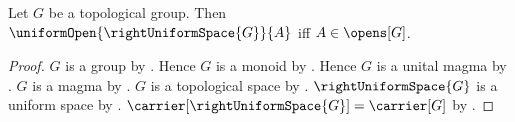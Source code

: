 \begin{theorem}\label{right_uniform_open_iff_topological_group_open}
    Let $G$ be a topological group.
    Then $\uniformOpen{\rightUniformSpace{G}}{A}$ iff $A\in\opens[G]$.
\end{theorem}
\begin{proof}
    $G$ is a group by .
    Hence $G$ is a monoid by .
    Hence $G$ is a unital magma by .
    $G$ is a magma by .
    $G$ is a topological space
        by .
    $\rightUniformSpace{G}$ is a uniform space
        by .
    $\carrier[\rightUniformSpace{G}]=\carrier[G]$
        by .


\end{proof}
